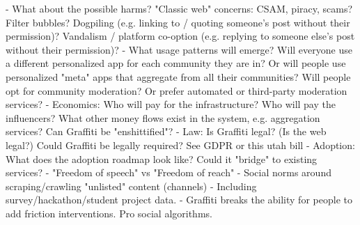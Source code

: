 - What about the possible harms? "Classic web" concerns: CSAM, piracy, scams? Filter bubbles? Dogpiling (e.g. linking to / quoting someone's post without their permission)? Vandalism / platform co-option (e.g. replying to someone else's post without their permission)?
- What usage patterns will emerge? Will everyone use a different personalized app for each community they are in? Or will people use personalized "meta" apps that aggregate from all their communities? Will people opt for community moderation? Or prefer automated or third-party moderation services?
- Economics: Who will pay for the infrastructure? Who will pay the influencers? What other money flows exist in the system, e.g. aggregation services? Can Graffiti be "enshittified"?
- Law: Is Graffiti legal? (Is the web legal?) Could Graffiti be legally required? See GDPR or this utah bill
- Adoption: What does the adoption roadmap look like? Could it "bridge" to existing services?
- "Freedom of speech" vs "Freedom of reach"
- Social norms around scraping/crawling "unlisted" content (channels)
- Including survey/hackathon/student project data.
- Graffiti breaks the ability for people to add friction interventions. Pro social algorithms.
